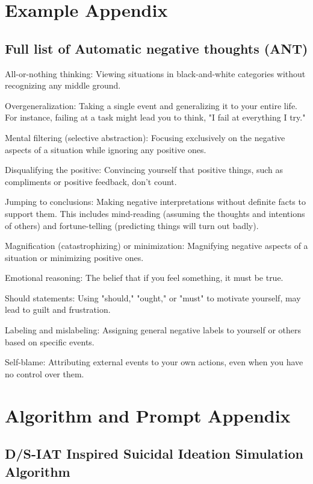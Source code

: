 \section{Example Appendix}
\label{sec:appendix}

\subsection{Full list of Automatic negative thoughts (ANT)}
\label{app:ant}

All-or-nothing thinking: Viewing situations in black-and-white categories without recognizing any middle ground.

Overgeneralization: Taking a single event and generalizing it to your entire life. For instance, failing at a task might lead you to think, "I fail at everything I try."

Mental filtering (selective abstraction): Focusing exclusively on the negative aspects of a situation while ignoring any positive ones. 

Disqualifying the positive: Convincing yourself that positive things, such as compliments or positive feedback, don't count.

Jumping to conclusions: Making negative interpretations without definite facts to support them. This includes mind-reading (assuming the thoughts and intentions of others) and fortune-telling (predicting things will turn out badly).

Magnification (catastrophizing) or minimization: Magnifying negative aspects of a situation or minimizing positive ones.

Emotional reasoning: The belief that if you feel something, it must be true.

Should statements: Using "should," "ought," or "must" to motivate yourself, may lead to guilt and frustration.

Labeling and mislabeling: Assigning general negative labels to yourself or others based on specific events.

Self-blame: Attributing external events to your own actions, even when you have no control over them.

\section{Algorithm and Prompt Appendix}
\label{sec:alg0}

\subsection{D/S-IAT Inspired Suicidal Ideation Simulation Algorithm}
\label{app:alg}

